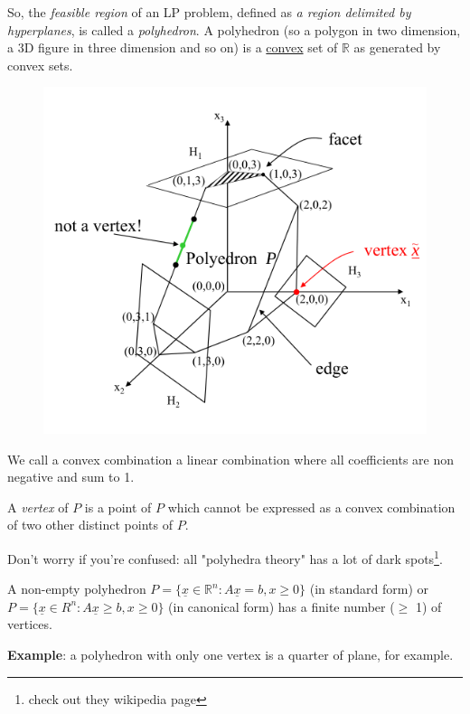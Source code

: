             So, the \textit{feasible region} of an LP problem, defined as \textit{a region delimited by hyperplanes}, is called a \textit{polyhedron}. A polyhedron (so a polygon in two dimension, a 3D figure in three dimension and so on) is a \underline{convex} set of $\mathbb{R}$ as generated by convex sets.
            \begin{figure}[H]
                \centering
                \includegraphics{./images/Polyhedron1.png}
            \end{figure}
            \begin{definition}
                We call a convex combination a linear combination where all coefficients are non negative and sum to 1.
            \end{definition}
            \begin{definition}[Vertex]
                A \emph{vertex} of $P$ is a point of $P$ which cannot be expressed as a convex combination of two other distinct points of $P$.    
            \end{definition}
            Don't worry if you're confused: all "polyhedra theory" has a lot of dark spots\footnote{check out they wikipedia page}.
            \begin{property}
                A non-empty polyhedron $P = \{\underline{x} \in \mathbb{R}^n : A\underline{x} = b, x \geq 0\}$ (in standard form) or
                $P = \{\underline{x} \in R^n : A\underline{x} \geq b, x \geq 0\}$ (in canonical form) has a finite number ($\geq$ 1) of vertices.
            \end {property}
            \textbf{Example}: a polyhedron with only one vertex is a quarter of plane, for example.\\

